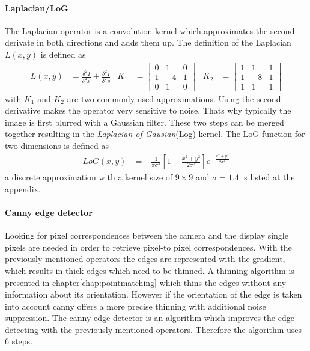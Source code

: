 \paragraph{Laplacian/LoG}
The Laplacian operator is a convolution kernel which approximates the second derivate in both directions and adds them up. The definition of the Laplacian $L(x,y)$ is defined as 
\begin{align}
L(x,y) &= \frac{\delta^2I}{\delta^2x} + \frac{\delta^2I}{\delta^2y} &
K_1 &= \begin{bmatrix} 0  & 1 & 0 \\ 1 & -4 & 1 \\ 0  & 1 &  0 \end{bmatrix} &
K_2 &= \begin{bmatrix} 1  & 1 & 1 \\ 1 & -8 & 1 \\ 1  & 1 &  1 \end{bmatrix} 
\end{align}
with $K_1$ and $K_2$ are two commonly used approximations. Using the second derivative makes the operator very sensitive to noise. Thats why typically the image is first blurred with a Gaussian filter. These two steps can be merged together resulting in the \textit{Laplacian of Gausian}(Log) kernel. The LoG function for two dimensions is defined as 
\begin{align}
LoG(x,y) &= -\frac{1}{\pi\sigma^4} \left[ 1-\frac{x^2+y^2}{2\sigma^2} \right] e^{-\frac{x^2+y^2}{2\sigma^2}}
\label{eq:LoG}
\end{align}
a discrete approximation with a kernel size of $9\times9$ and $\sigma=1.4$ is listed at the appendix. 

\paragraph{Canny edge detector}
Looking for pixel correspondences between the camera and the display single pixels are needed in order to retrieve pixel-to pixel correspondences.
With the previously mentioned operators the edges are represented with the gradient,  which results in thick edges which need to be thinned. A thinning algorithm is presented in chapter\ref{chap:pointmatching} which thins the edges without any information about its orientation. However if the orientation of the edge is taken into account canny offers a more precise thinning with additional noise suppression. 
The canny edge detector is an algorithm which improves the edge detecting with the previously mentioned operators. Therefore the algorithm uses 6 steps. 

